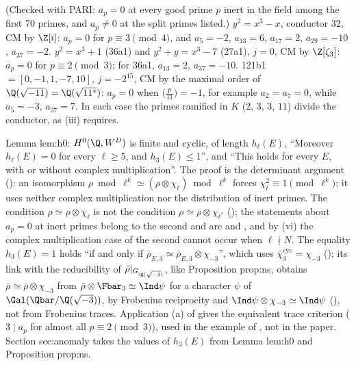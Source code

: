 \begin{example}\label{ex:ant:cmcurves}
(Checked with PARI: $a_p=0$ at every good prime $p$ inert in the field among the first $70$ primes, and $a_p\ne0$ at the split primes listed.)
$y^2=x^3-x$, conductor $32$, CM by $\Z[i]$: $a_p=0$ for $p\equiv3\pmod 4$, and $a_5=-2$, $a_{13}=6$, $a_{17}=2$, $a_{29}=-10$, $a_{37}=-2$.
$y^2=x^3+1$ (36a1) and $y^2+y=x^3-7$ (27a1), $j=0$, CM by $\Z[\zeta_3]$: $a_p=0$ for $p\equiv2\pmod3$; for 36a1, $a_{13}=2$, $a_{37}=-10$.
121b1 $=[0,-1,1,-7,10]$, $j=-2^{15}$, CM by the maximal order of $\Q(\sqrt{-11})=\Q(\sqrt{11^*})$: $a_p=0$ when $\bigl(\frac p{11}\bigr)=-1$, for example $a_2=a_7=0$,
while $a_5=-3$, $a_{37}=7$. In each case the primes ramified in $K$ ($2$, $3$, $3$, $11$) divide the conductor, as (iii) requires.
\end{example}

\begin{paperlink}\label{pl:ant:h0}
Lemma lem:h0: $H^0(\Q,W^D)$ is finite and cyclic, of length $h_\ell(E)$, ``Moreover $h_\ell(E)=0$ for every $\ell\ge5$, and $h_3(E)\le1$'', and ``This holds for
every $E$, with or without complex multiplication''. The proof is the determinant argument (): an isomorphism
$\rho\bmod\ell^k\simeq(\rho\otimes\chi_\ell)\bmod\ell^k$ forces $\chi_\ell^2\equiv1\pmod{\ell^k}$; it uses neither complex multiplication nor the distribution of inert
primes. The condition $\rho\simeq\rho\otimes\chi_\ell$ is not the condition $\rho\simeq\rho\otimes\chi_{\ell^*}$ (); the statements about $a_p=0$ at
inert primes belong to the second and are  and , and by (vi) the complex multiplication case of the
second cannot occur when $\ell\nmid N$. The equality $h_3(E)=1$ holds ``if and only if $\bar\rho_{E,3}\simeq\bar\rho_{E,3}\otimes\chi_{-3}$'', which uses
$\bar\chi_3^{\mathrm{cyc}}=\chi_{-3}$ (); its link with the reducibility of $\bar\rho|_{G_{\Q(\sqrt{-3})}}$, like Proposition prop:ns, obtains
$\bar\rho\simeq\bar\rho\otimes\chi_{-3}$ from $\bar\rho\otimes\Fbar_3\simeq\Ind\psi$ for a character $\psi$ of $\Gal(\Qbar/\Q(\sqrt{-3}))$, by Frobenius reciprocity and
$\Ind\psi\otimes\chi_{-3}\simeq\Ind\psi$ (), not from Frobenius traces. Application (a) of  gives the equivalent trace
criterion ($3\mid a_p$ for almost all $p\equiv2\pmod3$), used in the example of , not in the paper. Section sec:anomaly takes the values of $h_3(E)$ from
Lemma lem:h0 and Proposition prop:ns.
\end{paperlink}

